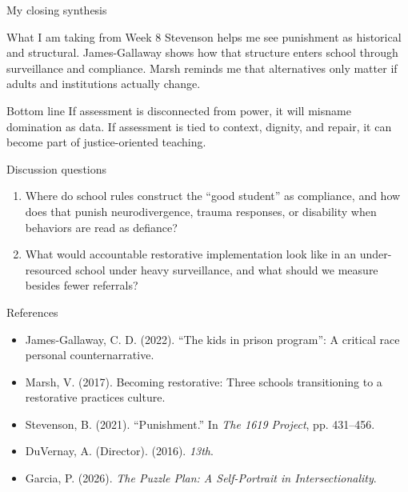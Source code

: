 \documentclass[aspectratio=169,11pt]{beamer}
\begin{document}
\begin{frame}{My closing synthesis}
\begin{block}{What I am taking from Week 8}
Stevenson helps me see punishment as historical and structural. James-Gallaway shows how that structure enters school through surveillance and compliance. Marsh reminds me that alternatives only matter if adults and institutions actually change.
\end{block}

\vspace{0.4cm}
\begin{alertblock}{Bottom line}
If assessment is disconnected from power, it will misname domination as data. If assessment is tied to context, dignity, and repair, it can become part of justice-oriented teaching.
\end{alertblock}
\end{frame}

\begin{frame}{Discussion questions}
\begin{enumerate}
  \item Where do school rules construct the ``good student'' as compliance, and how does that punish neurodivergence, trauma responses, or disability when behaviors are read as defiance?
  \item What would accountable restorative implementation look like in an under-resourced school under heavy surveillance, and what should we measure besides fewer referrals?
\end{enumerate}
\end{frame}

\begin{frame}{References}
\footnotesize
\begin{itemize}
  \item James-Gallaway, C. D. (2022). ``The kids in prison program'': A critical race personal counternarrative.
  \item Marsh, V. (2017). Becoming restorative: Three schools transitioning to a restorative practices culture.
  \item Stevenson, B. (2021). ``Punishment.'' In \textit{The 1619 Project}, pp. 431--456.
  \item DuVernay, A. (Director). (2016). \textit{13th}.
  \item Garcia, P. (2026). \textit{The Puzzle Plan: A Self-Portrait in Intersectionality}.
\end{itemize}
\end{frame}
\end{document}
